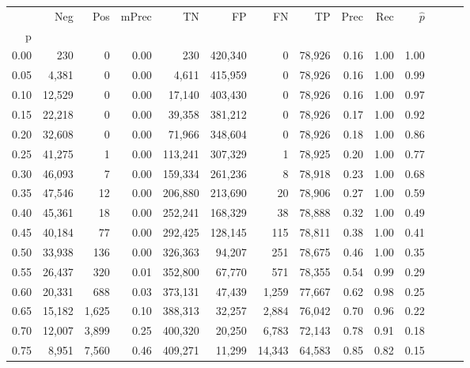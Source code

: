 \begin{tabular}{rrrrrrrrrrrrrr}
\toprule
{} &     Neg &     Pos & mPrec &       TN &       FP &      FN &      TP &  Prec &   Rec & $\hat{p}$ \\
p    &         &         &       &          &          &         &         &       &       &           \\
\midrule
0.00 &     230 &       0 &  0.00 &      230 &  420,340 &       0 &  78,926 &  0.16 &  1.00 &      1.00 \\
0.05 &   4,381 &       0 &  0.00 &    4,611 &  415,959 &       0 &  78,926 &  0.16 &  1.00 &      0.99 \\
0.10 &  12,529 &       0 &  0.00 &   17,140 &  403,430 &       0 &  78,926 &  0.16 &  1.00 &      0.97 \\
0.15 &  22,218 &       0 &  0.00 &   39,358 &  381,212 &       0 &  78,926 &  0.17 &  1.00 &      0.92 \\
0.20 &  32,608 &       0 &  0.00 &   71,966 &  348,604 &       0 &  78,926 &  0.18 &  1.00 &      0.86 \\
0.25 &  41,275 &       1 &  0.00 &  113,241 &  307,329 &       1 &  78,925 &  0.20 &  1.00 &      0.77 \\
0.30 &  46,093 &       7 &  0.00 &  159,334 &  261,236 &       8 &  78,918 &  0.23 &  1.00 &      0.68 \\
0.35 &  47,546 &      12 &  0.00 &  206,880 &  213,690 &      20 &  78,906 &  0.27 &  1.00 &      0.59 \\
0.40 &  45,361 &      18 &  0.00 &  252,241 &  168,329 &      38 &  78,888 &  0.32 &  1.00 &      0.49 \\
0.45 &  40,184 &      77 &  0.00 &  292,425 &  128,145 &     115 &  78,811 &  0.38 &  1.00 &      0.41 \\
0.50 &  33,938 &     136 &  0.00 &  326,363 &   94,207 &     251 &  78,675 &  0.46 &  1.00 &      0.35 \\
0.55 &  26,437 &     320 &  0.01 &  352,800 &   67,770 &     571 &  78,355 &  0.54 &  0.99 &      0.29 \\
0.60 &  20,331 &     688 &  0.03 &  373,131 &   47,439 &   1,259 &  77,667 &  0.62 &  0.98 &      0.25 \\
0.65 &  15,182 &   1,625 &  0.10 &  388,313 &   32,257 &   2,884 &  76,042 &  0.70 &  0.96 &      0.22 \\
0.70 &  12,007 &   3,899 &  0.25 &  400,320 &   20,250 &   6,783 &  72,143 &  0.78 &  0.91 &      0.18 \\
0.75 &   8,951 &   7,560 &  0.46 &  409,271 &   11,299 &  14,343 &  64,583 &  0.85 &  0.82 &      0.15 \\

\end{tabular}
